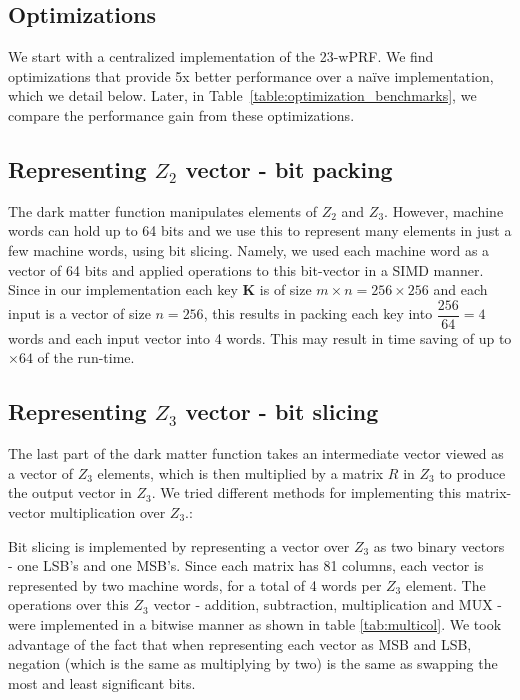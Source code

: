 \subsection{Optimizations}
\label{subsec:implementation_opt}
We start with a centralized implementation of the 23-wPRF. We find optimizations that provide 5x better performance over a na\"ive implementation, which we detail below. Later, in Table~\ref{table:optimization_benchmarks}, we compare the performance gain from these optimizations.

\subsection{Representing $Z_2$ vector - bit packing}

The dark matter function manipulates elements of $Z_2$ and $Z_3$. However, machine words can hold up to 64 bits and we use this to represent many elements in just a few machine words, using bit slicing. Namely, we used each machine word as a vector of 64 bits and applied operations to this bit-vector in a SIMD manner.
Since in our implementation each key $\textbf{K}$  is of size $m \times n = 256 \times 256$ and each input is a vector of size $n = 256$, this results in packing each key into $\dfrac {256}{64} = 4$ words and each input vector into 4 words. This may result in time saving of up to $\times 64$ of the run-time.

\subsection{Representing $Z_3$ vector - bit slicing}

The last part of the dark matter function takes an intermediate vector viewed as a vector of $Z_3$ elements, which is then multiplied 
by a matrix $R$ in $Z_3$ to produce the output vector in $Z_3$. We tried different methods for implementing this matrix-vector multiplication over $Z_3$.:	

Bit slicing is implemented  by representing a vector over $Z_3$  as two binary vectors - one LSB's and one MSB's. Since each matrix has 81 columns, each vector is represented by two machine words, for a total of 4 words per $Z_3$ element. The operations over this $Z_3$ vector - addition, subtraction, multiplication and MUX  - were implemented in a bitwise manner as shown in table \ref{tab:multicol}. We took advantage of the fact that when representing each vector as MSB and LSB, negation (which is the same as multiplying by two) is the same as swapping the most and least significant bits. 

